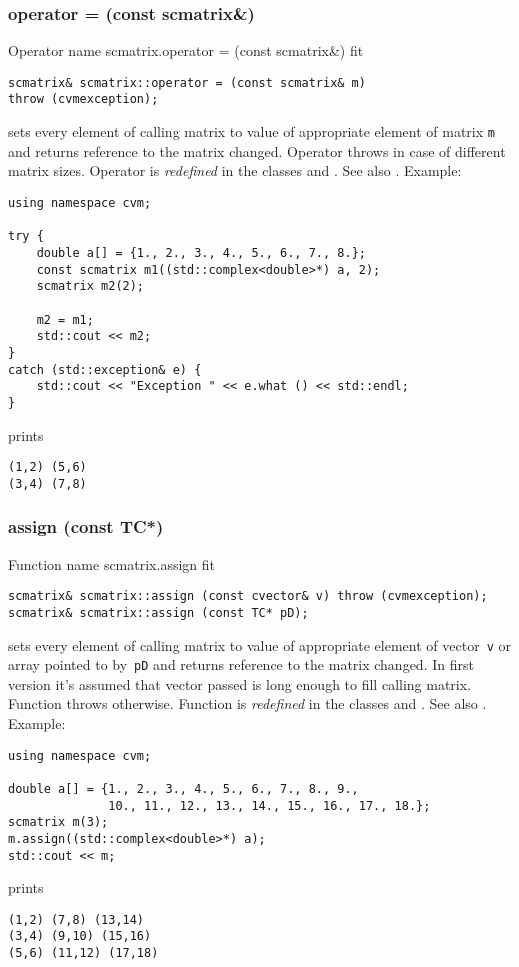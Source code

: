 \subsubsection{operator = (const scmatrix\&)}
Operator%
\pdfdest name {scmatrix.operator = (const scmatrix&)} fit
\begin{verbatim}
scmatrix& scmatrix::operator = (const scmatrix& m)
throw (cvmexception);
\end{verbatim}
sets  every element of  calling matrix to  value of
appropriate element of  matrix \verb"m"
and returns  reference to
the matrix changed.
Operator throws  
in case of different matrix sizes.
Operator is \emph{redefined} in the classes
and .
See also .
Example:
\begin{Verbatim}
using namespace cvm;

try {
    double a[] = {1., 2., 3., 4., 5., 6., 7., 8.};
    const scmatrix m1((std::complex<double>*) a, 2);
    scmatrix m2(2);

    m2 = m1;
    std::cout << m2;
}
catch (std::exception& e) {
    std::cout << "Exception " << e.what () << std::endl;
}
\end{Verbatim}
prints
\begin{Verbatim}
(1,2) (5,6)
(3,4) (7,8)
\end{Verbatim}
\newpage





\subsubsection{assign (const TC*)}
Function%
\pdfdest name {scmatrix.assign} fit
\begin{verbatim}
scmatrix& scmatrix::assign (const cvector& v) throw (cvmexception);
scmatrix& scmatrix::assign (const TC* pD);
\end{verbatim}
sets every element of  calling matrix to  value of
appropriate element of  vector~\verb'v'
or  array pointed to by~\verb"pD"
and returns  reference to
the matrix changed.
In first version it's assumed that vector passed is long
enough to fill calling matrix. Function throws  
otherwise.
Function is \emph{redefined} in the classes
and .
See also .
Example:
\begin{Verbatim}
using namespace cvm;

double a[] = {1., 2., 3., 4., 5., 6., 7., 8., 9.,
              10., 11., 12., 13., 14., 15., 16., 17., 18.};
scmatrix m(3);
m.assign((std::complex<double>*) a);
std::cout << m;
\end{Verbatim}
prints
\begin{Verbatim}
(1,2) (7,8) (13,14)
(3,4) (9,10) (15,16)
(5,6) (11,12) (17,18)
\end{Verbatim}
\newpage




